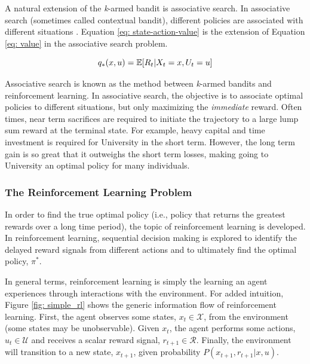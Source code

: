 A natural extension of the \textit{k}-armed bandit is associative search.  In associative search (sometimes called contextual bandit), different policies are associated with different situations \cite{bartosuttonbrouwer}.  Equation \ref{eq: state-action-value} is the extension of Equation \ref{eq: value} in the associative search problem.

\begin{equation}
    \centering
    q_*(x, u) = \mathbb{E}[R_t | X_t = x, U_t = u]
    \label{eq: state-action-value}
\end{equation}

Associative search is known as the method between \textit{k}-armed bandits and reinforcement learning.  In associative search, the objective is to associate optimal policies to different situations, but only maximizing the \textit{immediate} reward.  Often times, near term sacrifices are required to initiate the trajectory to a large lump sum reward at the terminal state.  For example, heavy capital and time investment is required for University in the short term.  However, the long term gain is so great that it outweighs the short term losses, making going to University an optimal policy for many individuals.

\subsubsection{The Reinforcement Learning Problem}

In order to find the true optimal policy (i.e., policy that returns the greatest rewards over a long time period), the topic of reinforcement learning is developed.  In reinforcement learning, sequential decision making is explored to identify the delayed reward signals from different actions and to ultimately find the optimal policy, $\pi^*$.  

In general terms, reinforcement learning is simply the learning an agent experiences through interactions with the environment.  For added intuition, Figure \ref{fig: simple_rl} shows the generic information flow of reinforcement learning. First, the agent observes some states, $x_t \in \mathcal{X}$, from the environment (some states may be unobservable).  Given $x_t$, the agent performs some actions, $u_t \in \mathcal{U}$ and receives a scalar reward signal, $r_{t+1} \in \mathcal{R}$.  Finally, the environment will transition to a new state, $x_{t+1}$, given probability $P(x_{t+1}, r_{t+1} | x, u)$.


